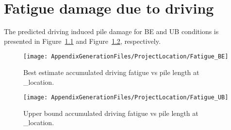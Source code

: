 \chapter{Fatigue damage due to driving}\label{sec_5}
The predicted driving induced pile damage for BE and UB conditions is
presented in Figure~\ref{fatigue_BE} and Figure~\ref{fatigue_UB}, respectively.  

\begin{figure}[!htbp]
\texttt{[image: AppendixGenerationFiles/ProjectLocation/Fatigue\_BE]}
\caption{Best estimate accumulated driving fatigue vs pile length at {\ID_location}.}
\label{fatigue_BE}
\end{figure}

\begin{figure}[!htbp]
\texttt{[image: AppendixGenerationFiles/ProjectLocation/Fatigue\_UB]}
\caption{Upper bound accumulated driving fatigue vs pile length at {\ID_location}.}
\label{fatigue_UB}
\end{figure}